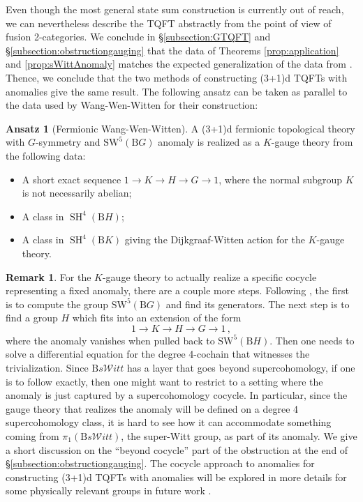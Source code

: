 \documentclass[11pt,reqno]{amsart}
\DeclareMathOperator{\SH}{SH}
\newcommand{\sWitt}{s\mathscr{W}itt}
\newcommand{\rB}{\mathrm{B}}
\numberwithin{equation}{section}
\theoremstyle{plain}
\theoremstyle{definition}
\newtheorem{ansatz}[equation]{Ansatz}
\newtheorem{rem}[equation]{Remark}
\begin{document}
Even though the most general state sum construction is currently out of reach, we can nevertheless describe the TQFT abstractly from the point of view of fusion 2-categories. We conclude in \S\ref{subsection:GTQFT} and \S\ref{subsection:obstructiongauging}  that the data of Theorems \ref{prop:application} and \ref{prop:sWittAnomaly} matches the expected generalization of the data from \cite{Wang:2017loc}. Thence, we conclude that the two methods of constructing (3+1)d TQFTs with anomalies give the same result. The following ansatz can be taken as parallel to the data used by Wang-Wen-Witten \cite{Wang:2017loc} for their construction:
\begin{ansatz}[Fermionic Wang-Wen-Witten]\label{ansatz:fernionicTQFT}
 A (3+1)d fermionic topological theory with $G$-symmetry and {$\mathrm{SW}^5(\rB G)$} anomaly is realized as a $K$-gauge theory from the following data:
\begin{itemize}
    \item A short exact sequence $1 \rightarrow K \rightarrow H \rightarrow G\rightarrow 1$, where the normal subgroup $K$ is not necessarily abelian;
     \item A class in $\SH^4(\rB H)$;
    \item A class in $\SH^4(\rB K)$ giving the Dijkgraaf-Witten action for the $K$-gauge theory. 
\end{itemize}
\end{ansatz}
\begin{rem}
For the $K$-gauge theory to actually realize a specific cocycle representing a fixed anomaly, there are a couple more steps. Following \cite{Wang:2017loc}, the first is to compute the group $\mathrm{SW}^5(\rB G)$ and find its generators. The next step is to find a group $H$ which fits into an extension of the form 
\begin{equation}
    1\longrightarrow K \longrightarrow H \longrightarrow G \longrightarrow 1\,,
\end{equation}
where the anomaly vanishes when pulled back to $\mathrm{SW}^5(\rB H)$. Then one needs to solve a differential equation for the degree 4-cochain that witnesses the trivialization. Since $\rB\sWitt$ has a layer that goes beyond supercohomology, if one is to  follow \cite{Wang:2017loc} exactly, then one might want to restrict to a setting where the anomaly is just captured by a supercohomology cocycle. In particular, since the gauge theory that realizes the anomaly will be defined on a degree 4 supercohomology class, it is hard to see how it can accommodate something coming from $\pi_1(\rB \sWitt)$, the super-Witt group, as part of its anomaly. We give a short discussion on the ``beyond cocycle'' part of the obstruction at the end of \S\ref{subsection:obstructiongauging}. The cocycle approach to anomalies for constructing (3+1)d TQFTs with anomalies will be explored in more details for some physically relevant groups in future work \cite{DYY1}.
\end{rem}
\end{document}
